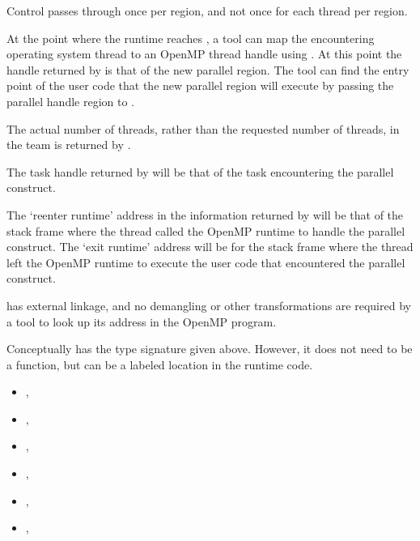 Control passes through 
once per region, and not once for each thread per region.

At the point where the runtime reaches ,
a tool can map the encountering operating system thread to an OpenMP
thread handle using
.
At this point the handle returned by 
is that of the new parallel region.
The tool can find the entry point of the user code that
the new parallel region will execute by passing the parallel handle region
to .

The actual number of threads, rather than the requested number of threads,
in the team is returned by
.

The task handle returned by
will be that of the task encountering the parallel construct.

The `reenter runtime' address in the information returned by
will be that of the stack frame where the thread called the OpenMP
runtime to handle the parallel construct.
The `exit runtime' address will be for the stack frame where the thread
left the OpenMP runtime to execute the user code that encountered
the parallel construct.

\restrictions

 has external  linkage, and no
demangling or other transformations are required by a tool
to look up its address in the OpenMP program.

Conceptually  has the type signature
given above.
However, it does not need to be a function, but can be a labeled location
in the runtime code.

\crossreferences

\begin{itemize}
\item
  , 
\item
  , 
\item
  , 
\item
  , 
\item
  , 
\item
  , 
\end{itemize}

